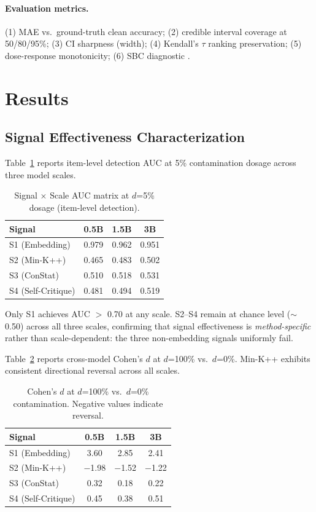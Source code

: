 \documentclass[11pt,a4paper]{article}
\begin{document}
\paragraph{Evaluation metrics.}
(1) MAE vs.\ ground-truth clean accuracy; (2) credible interval coverage at 50/80/95\%; (3) CI sharpness (width); (4) Kendall's $\tau$ ranking preservation; (5) dose-response monotonicity; (6) SBC diagnostic \citep{talts2018validating}.

\section{Results}

\subsection{Signal Effectiveness Characterization}
\label{sec:signal}

Table~\ref{tab:signal_auc} reports item-level detection AUC at 5\% contamination dosage across three model scales.

\begin{table}[h]
\centering
\caption{Signal $\times$ Scale AUC matrix at $d$=5\% dosage (item-level detection).}
\label{tab:signal_auc}
\begin{tabular}{lccc}
\toprule
Signal & 0.5B & 1.5B & 3B \\
\midrule
S1 (Embedding) & 0.979 & 0.962 & 0.951 \\
S2 (Min-K++) & 0.465 & 0.483 & 0.502 \\
S3 (ConStat) & 0.510 & 0.518 & 0.531 \\
S4 (Self-Critique) & 0.481 & 0.494 & 0.519 \\
\bottomrule
\end{tabular}
\end{table}

Only S1 achieves AUC $>$ 0.70 at any scale.
S2--S4 remain at chance level ($\sim$0.50) across all three scales, confirming that signal effectiveness is \emph{method-specific} rather than scale-dependent: the three non-embedding signals uniformly fail.

Table~\ref{tab:cohens_d} reports cross-model Cohen's $d$ at $d$=100\% vs.\ $d$=0\%.
Min-K++ exhibits consistent directional reversal across all scales.

\begin{table}[h]
\centering
\caption{Cohen's $d$ at $d$=100\% vs.\ $d$=0\% contamination. Negative values indicate reversal.}
\label{tab:cohens_d}
\begin{tabular}{lccc}
\toprule
Signal & 0.5B & 1.5B & 3B \\
\midrule
S1 (Embedding) & 3.60 & 2.85 & 2.41 \\
S2 (Min-K++) & $-$1.98 & $-$1.52 & $-$1.22 \\
S3 (ConStat) & 0.32 & 0.18 & 0.22 \\
S4 (Self-Critique) & 0.45 & 0.38 & 0.51 \\
\bottomrule
\end{tabular}
\end{table}
\end{document}
